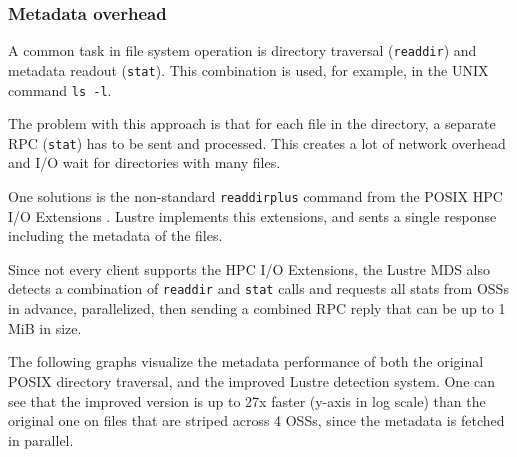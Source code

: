 \subsubsection{Metadata overhead}

A common task in file system operation is directory traversal (\texttt{readdir})
and metadata readout (\texttt{stat}). This combination is used, for example, in
the UNIX command \texttt{ls -l}.

The problem with this approach is that for each file in the directory, a separate
RPC (\texttt{stat}) has to be sent and processed. This creates a lot of network
overhead and I/O wait for directories with many files.

One solutions is the non-standard \texttt{readdirplus} command from the POSIX
HPC I/O Extensions \cite{posix-ext}. Lustre implements this extensions, and sents
a single response including the metadata of the files.

Since not every client supports the HPC I/O Extensions, the Lustre MDS also
detects a combination of \texttt{readdir} and \texttt{stat} calls and requests
all stats from OSSs in advance, parallelized, then sending a combined RPC reply
that can be up to 1 MiB in size.

The following graphs visualize the metadata performance of both the original
POSIX directory traversal, and the improved Lustre detection system. One can
see that the improved version is up to 27x faster (y-axis in log scale) than
the original one on files that are striped across 4 OSSs, since the metadata is
fetched in parallel.

\vspace{0.5cm}

